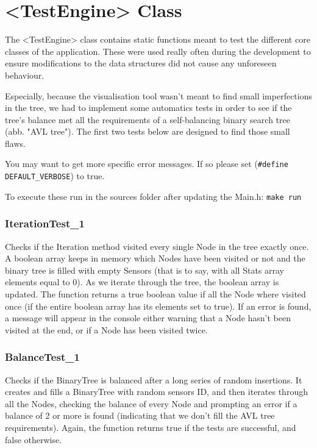 \documentclass[10pt]{article}
\begin{document}
\section{<TestEngine> Class}
The <TestEngine> class contains static functions meant to test the different core classes of the application. These were used really often during the development to ensure modifications to the data structures did not cause any unforeseen behaviour.

Especially, because the visualisation tool wasn't meant to find small imperfections in the tree, we had to implement some automatics tests in order to see if the tree's balance met all the requirements of a self-balancing binary search tree (abb. "AVL tree"). The first two tests below are designed to find those small flaws.

You may want to get more specific error messages. If so please set (\texttt{\#define DEFAULT\_VERBOSE}) to true.

To execute these run in the sources folder after updating the Main.h:
\texttt{make run}

\subsubsection{IterationTest\_1}
Checks if the Iteration method visited every single Node in the tree exactly once. A boolean array keeps in memory which Nodes have been visited or not and the binary tree is filled with empty Sensors (that is to say, with all Stats array elements equal to 0). As we iterate through the tree, the boolean array is updated. The function returns a true boolean value if all the Node where visited once (if the entire boolean array has its elements set to true). If an error is found, a message will appear in the console either warning that a Node hasn't been visited at the end, or if a Node has been visited twice.

\subsubsection{BalanceTest\_1}
Checks if the BinaryTree is balanced after a long series of random insertions. It creates and fills a BinaryTree with random sensors ID, and then iterates through all the Nodes, checking the balance of every Node and prompting an error if a balance of 2 or more is found (indicating that we don't fill the AVL tree requirements). Again, the function returns true if the tests are successful, and false otherwise.
\end{document}
